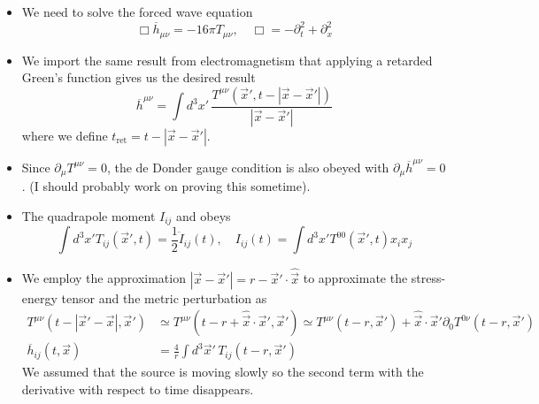 \begin{itemize}
	\item We need to solve the forced wave equation 
		\[
			\Box \overline{ h }_{ \mu \nu }  =  - 16 \pi T_{ \mu \nu }, \quad \Box  = - \partial _ t ^ 2 + \partial  _ x ^ 2 
		\]
	\item We import the same result from electromagnetism that 
		applying a retarded Green's function gives us the desired result 
	\[
		\overline{ h }^{ \mu \nu }  = \int d ^ 3 x '  \, \frac{T ^{ \mu \nu } \left(  
		\vec{x} ' , t - | \vec{x} - \vec{x} ' | \right) }{ | \vec{x} - \vec{x} '  | }
	\] where we define $ t_{ \text{ret} } = t - | \vec{x}  - \vec{x} ' | $. 
\item Since $ \partial  _ \mu T ^{ \mu \nu }  = 0 $, the de Donder gauge condition is also obeyed with $ \partial_ \mu \overline{ h} ^{ \mu \nu }  = 0 $. (I should probably work on proving this sometime).
\item The quadrapole moment $ I_{ ij } $ and obeys 
	\[
		\int d ^3 x' T_{ ij } \left(  \vec{x} ' , t  \right)   = \frac{1}{2 } \ddot{I }_{ ij } \left( t  \right), \quad I_{ ij } ( t )  = \int d ^ 3 x ' T ^{ 00 } \left( \vec{x}  ', t   \right) x _ i x _ j  
	\]   
\item We employ the approximation $  | \vec{x} - \vec{x} ' |   = r - \vec{x} ' \cdot  \hat{ \vec{x} } $ to approximate the stress-energy 
	tensor and the metric perturbation as
	\begin{align*}
		T^{ \mu \nu } \left( t - | \vec{x} ' - \vec{x} |, \vec{x} '  \right)  & \simeq T ^{ \mu \nu } \left(  t - r + \hat{\vec{x} } \cdot  \vec{x} ' , \vec{x} '  \right)  \simeq T^{ \mu \nu } \left(  t - r , \vec{x} '  \right)  + \hat{ \vec{x} } \cdot  \vec{x} ' \partial _ 0 T ^{ 0 \nu } 
		\left(  t - r , \vec{x} '  \right) \\ 
		\overline{ h } _{ ij } \left( t, \vec{x} \right) 
		&=  \frac{4}{r } \int d ^ 3 \vec{x} ' \, 
		T_{ ij } \left( t - r , \vec{x} '  \right)
	\end{align*}
We assumed that the source is moving slowly so the second term 
with the derivative with respect to time disappears. 
\end{itemize}
